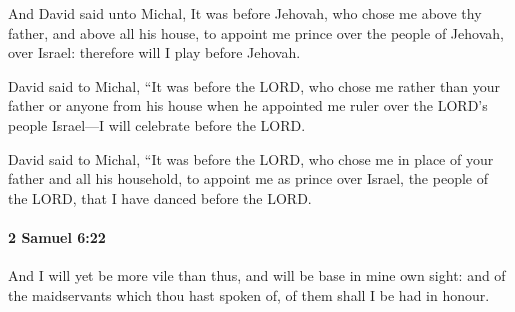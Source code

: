 			\begin{versebox}
					\item[BHS] 
					\item[ASV] And David said unto Michal, It was before Jehovah, who chose me above thy father, and above all his house, to appoint me prince over the people of Jehovah, over Israel: therefore will I play before Jehovah.
					\item[NIV] David said to Michal, “It was before the LORD, who chose me rather than your father or anyone from his house when he appointed me ruler over the LORD’s people Israel—I will celebrate before the LORD.
					\item[NRSV] David said to Michal, “It was before the LORD, who chose me in place of your father and all his household, to appoint me as prince over Israel, the people of the LORD, that I have danced before the LORD.
			\end{versebox}

		\paragraph{2 Samuel 6:22} %
			\label{2SAMUEL-6-22}

			And I will yet be more vile than thus, and will be base in mine own sight: and of the maidservants which thou hast spoken of, of them shall I be had in honour.

